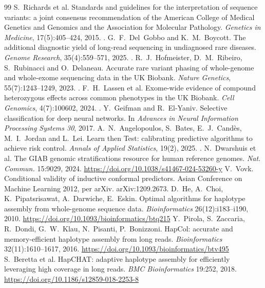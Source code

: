 \begin{thebibliography}{99}
S.~Richards et al.
\newblock Standards and guidelines for the interpretation of sequence
variants: a joint consensus recommendation of the American College of Medical
Genetics and Genomics and the Association for Molecular Pathology.
\newblock \emph{Genetics in Medicine}, 17(5):405--424, 2015.
\newblock {}.
G.~F.~Del~Gobbo and K.~M.~Boycott.
\newblock The additional diagnostic yield of long-read sequencing in
undiagnosed rare diseases.
\newblock \emph{Genome Research}, 35(4):559--571, 2025.
\newblock {}.
R.~J.~Hofmeister, D.~M.~Ribeiro, S.~Rubinacci and O.~Delaneau.
\newblock Accurate rare variant phasing of whole-genome and whole-exome
sequencing data in the UK Biobank.
\newblock \emph{Nature Genetics}, 55(7):1243--1249, 2023.
\newblock {}.
F.~H.~Lassen et al.
\newblock Exome-wide evidence of compound heterozygous effects across common
phenotypes in the UK Biobank.
\newblock \emph{Cell Genomics}, 4(7):100602, 2024.
\newblock {}.
Y.~Geifman and R.~El-Yaniv.
\newblock Selective classification for deep neural networks.
\newblock In \emph{Advances in Neural Information Processing Systems 30}, 2017.
A.~N.~Angelopoulos, S.~Bates, E.~J.~Cand\`es, M.~I.~Jordan and L.~Lei.
\newblock Learn then Test: calibrating predictive algorithms to achieve risk
control.
\newblock \emph{Annals of Applied Statistics}, 19(2), 2025.
\newblock {}.
 N.~Dwarshuis et al. The GIAB genomic stratifications resource for human reference genomes. \emph{Nat. Commun.} 15:9029, 2024. \url{https://doi.org/10.1038/s41467-024-53260-y}
V.~Vovk.
\newblock Conditional validity of inductive conformal predictors.
\newblock Asian Conference on Machine Learning 2012, per arXiv.
\newblock arXiv:1209.2673.
 D.~He, A.~Choi, K.~Pipatsrisawat, A.~Darwiche, E.~Eskin. Optimal algorithms for haplotype assembly from whole-genome sequence data. \emph{Bioinformatics} 26(12):i183--i190, 2010. \url{https://doi.org/10.1093/bioinformatics/btq215}
 Y.~Pirola, S.~Zaccaria, R.~Dondi, G.~W.~Klau, N.~Pisanti, P.~Bonizzoni. HapCol: accurate and memory-efficient haplotype assembly from long reads. \emph{Bioinformatics} 32(11):1610--1617, 2016. \url{https://doi.org/10.1093/bioinformatics/btv495}
 S.~Beretta et al. HapCHAT: adaptive haplotype assembly for efficiently leveraging high coverage in long reads. \emph{BMC Bioinformatics} 19:252, 2018. \url{https://doi.org/10.1186/s12859-018-2253-8}

\end{thebibliography}
